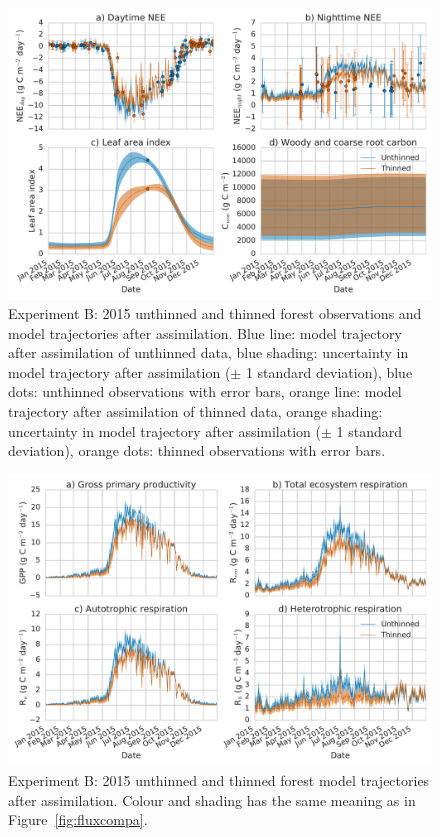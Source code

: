 \documentclass[draft,jgrga]{agutexSI}
\begin{document}
 \begin{figure}
 \noindent\includegraphics[width=40pc]{obs_compb.pdf}
\caption{Experiment B: 2015 unthinned and thinned forest observations and model trajectories after assimilation. Blue line: model trajectory after assimilation of unthinned data, blue shading: uncertainty in model trajectory after assimilation (\(\pm\) 1 standard deviation), blue dots: unthinned observations with error bars, orange line: model trajectory after assimilation of thinned data, orange shading: uncertainty in model trajectory after assimilation (\(\pm\) 1 standard deviation), orange dots: thinned observations with error bars.}
 \label{fig:obscompb}
 \end{figure}
 
 
 \begin{figure}
 \noindent\includegraphics[width=40pc]{flux_compb.pdf}
\caption{Experiment B: 2015 unthinned and thinned forest model trajectories after assimilation. Colour and shading has the same meaning as in Figure~\ref{fig:fluxcompa}.}
 \label{fig:fluxcompb}
 \end{figure}
 
\end{document}
